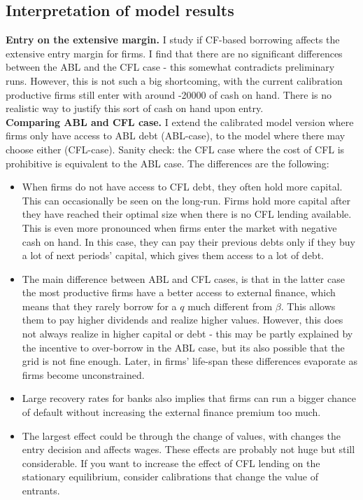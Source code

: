 \documentclass[12pt]{article}
\begin{document}
\newpage

\subsection*{Interpretation of model results}
\textbf{Entry on the extensive margin.} I study if CF-based borrowing affects the extensive entry margin for firms. I find that there are no significant differences between the ABL and the CFL case - this somewhat contradicts preliminary runs. However, this is not such a big shortcoming, with the current calibration productive firms still enter with around -20000 of cash on hand. There is no realistic way to justify this sort of cash on hand upon entry. \vspace{3mm} \\
\textbf{Comparing ABL and CFL case.} I extend the calibrated model version where firms only have access to ABL debt (ABL-case), to the model where there may choose either (CFL-case). Sanity check: the CFL case where the cost of CFL is prohibitive is equivalent to the ABL case. The differences are the following: 
\begin{itemize}\setlength\itemsep{0em} \small
    \item When firms do not have access to CFL debt, they often hold more capital. This can occasionally be seen on the long-run. Firms hold more capital after they have reached their optimal size when there is no CFL lending available. This is even more pronounced when firms enter the market with negative cash on hand. In this case, they can pay their previous debts only if they buy a lot of next periods' capital, which gives them access to a lot of debt.
    \item The main difference between ABL and CFL cases, is that in the latter case the most productive firms have a better access to external finance, which means that they rarely borrow for a $q$ much different from $\beta$. This allows them to pay higher dividends and realize higher values. However, this does not always realize in higher capital or debt - this may be partly explained by the incentive to over-borrow in the ABL case, but its also possible that the grid is not fine enough. Later, in firms' life-span these differences evaporate as firms become unconstrained.
    \item Large recovery rates for banks also implies that firms can run a bigger chance of default without increasing the external finance premium too much.
    \item The largest effect could be through the change of values, with changes the entry decision and affects wages. These effects are probably not huge but still considerable. If you want to increase the effect of CFL lending on the stationary equilibrium, consider calibrations that change the value of entrants.
\end{itemize} \normalsize
\end{document}
